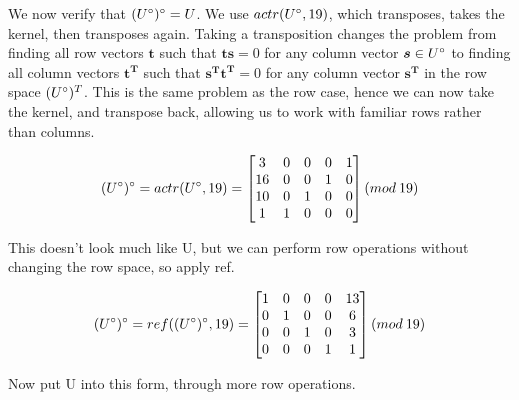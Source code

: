 \documentclass[10pt,a4paper]{report}
\begin{document}
\vspace{5mm}

We now verify that $(U\degree)\degree = U$. We use $actr(U\degree,19)$, which transposes, takes the kernel, then transposes again. Taking a transposition changes the problem from finding all row vectors $\bm{t}$ such that $\bm{ts}=0$ for any column vector $\bm{s} \in U\degree$ to finding all column vectors $\bm{t^T}$ such that $\bm{s^T  t^T}=0$ for any column vector $\bm{s^T}$ in the row space $(U\degree)^T$. This is the same problem as the row case, hence we can now take the kernel, and transpose back, allowing us to work with familiar rows rather than columns.

\vspace{5mm}

\begin{equation*}
(U\degree)\degree = actr(U\degree,19) = \begin{bmatrix}
3 & 0 & 0 & 0 & 1 \\
16 & 0 & 0 & 1 & 0\\
10 & 0 & 1 & 0 & 0\\
1 & 1 & 0 & 0 & 0\\
\end{bmatrix} (mod \: 19)
\end{equation*}

\vspace{5mm}

This doesn't look much like U, but we can perform row operations without changing the row space, so apply ref.

\vspace{5mm}

\begin{equation*}
(U\degree)\degree = ref((U\degree)\degree,19) = \begin{bmatrix}
1 & 0 & 0 & 0 & 13 \\
0 & 1 & 0 & 0 & 6\\
0 & 0 & 1 & 0 & 3\\
0 & 0 & 0 & 1 & 1\\
\end{bmatrix} (mod \: 19)
\end{equation*}

\vspace{5mm}

Now put U into this form, through more row operations. 

\vspace{5mm}
\end{document}
